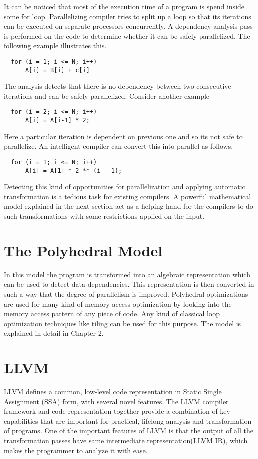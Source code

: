 It can be noticed that most of the execution time of a program is spend inside some
for loop. Parallelizing compiler tries to split up a loop so that its iterations can
be executed on separate processors concurrently. A dependency analysis pass is 
performed on the code to determine whether it can be safely parallelized. The following
example illustrates this.

{\footnotesize
\begin{lstlisting}
  for (i = 1; i <= N; i++)
      A[i] = B[i] + c[i]
\end{lstlisting}
}

The analysis detects that there is no dependency between two consecutive iterations and
can be safely parallelized. Consider another example

{\footnotesize
\begin{lstlisting}
  for (i = 2; i <= N; i++)
      A[i] = A[i-1] * 2;
\end{lstlisting}
}

Here a particular iteration is dependent on previous one and so its not safe to parallelize.
An intelligent compiler can convert this into parallel as follows.

{\footnotesize
\begin{lstlisting}
  for (i = 1; i <= N; i++)
      A[i] = A[1] * 2 ** (i - 1);
\end{lstlisting}
}

Detecting this kind of opportunities for parallelization and applying automatic transformation
is a tedious task for existing compilers. A powerful mathematical model explained in the next
section act as a helping hand for the compilers to do such transformations with some
restrictions applied on the input.

\section{The Polyhedral Model}

In this model the program is transformed into an algebraic representation which can be used to
detect data dependencies. This representation is then converted in such a way that the degree
of parallelism is improved. Polyhedral optimizations are used for many kind of memory access optimization by
looking into the memory access pattern of any piece of code. Any kind of classical
 loop optimization techniques like tiling can be used for this purpose. The model is
explained in detail in Chapter 2.

\section{LLVM}
LLVM defines a common, low-level code representation in Static Single Assignment
(SSA) form, with several novel features. The LLVM compiler framework and code
representation together provide a combination of key capabilities that are
important for practical, lifelong analysis and transformation of programs.
One of the important features of LLVM is that the output of all the
transformation passes have same intermediate representation(LLVM IR), which
makes the programmer to analyze it with ease.


